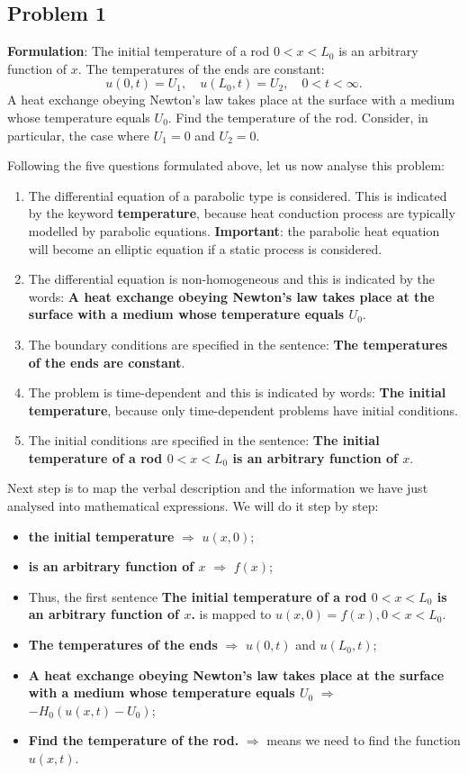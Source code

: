 \subsection{Problem 1}

{\bfseries Formulation}: The initial temperature of a rod $0<x<L_{0}$ is an arbitrary function of $x$. The temperatures of the ends are constant:
\begin{equation*}
u(0,t) = U_{1}, \quad u(L_{0},t) = U_{2}, \quad 0<t<\infty.
\end{equation*}
A heat exchange obeying Newton's law takes place at the surface with a medium whose temperature equals $U_{0}$. Find the temperature of the rod. Consider, in particular, the case where $U_{1}=0$ and $U_{2}=0$.\par
Following the five questions formulated above, let us now analyse this problem:
\begin{enumerate}
\item The differential equation of a parabolic type is considered. This is indicated by the keyword {\bfseries temperature}, because heat conduction process are typically modelled by parabolic equations. {\bfseries Important}: the parabolic heat equation will become an elliptic equation if a static process is considered.
\item The differential equation is non-homogeneous and this is indicated by the words: {\bfseries A heat exchange obeying Newton's law takes place at the surface with a medium whose temperature equals $U_{0}$}.
\item The boundary conditions are specified in the sentence: {\bfseries The temperatures of the ends are constant}.
\item The problem is time-dependent and this is indicated by words: {\bfseries The initial temperature}, because only time-dependent problems have initial conditions.
\item The initial conditions are specified in the sentence: {\bfseries The initial temperature of a rod $0<x<L_{0}$ is an arbitrary function of $x$}.
\end{enumerate}
Next step is to map the verbal description and the information we have just analysed into mathematical expressions. We will do it step by step:
\begin{itemize}
\item {\bfseries the initial temperature} $\Longrightarrow$ $u(x,0)$;
\item {\bfseries is an arbitrary function of $x$} $\Longrightarrow$ $f(x)$;
\item Thus, the first sentence {\bfseries The initial temperature of a rod $0<x<L_{0}$ is an arbitrary function of $x$.} is mapped to $u(x,0)=f(x), 0<x<L_{0}$.
\item {\bfseries The temperatures of the ends} $\Longrightarrow$ $u(0,t)$ and $u(L_{0},t)$;
\item {\bfseries A heat exchange obeying Newton's law takes place at the surface with a medium whose temperature equals $U_{0}$} $\Longrightarrow$ $-H_{0}(u(x,t)-U_{0})$;
\item {\bfseries Find the temperature of the rod.} $\Longrightarrow$ means we need to find the function $u(x,t)$.
\end{itemize}
